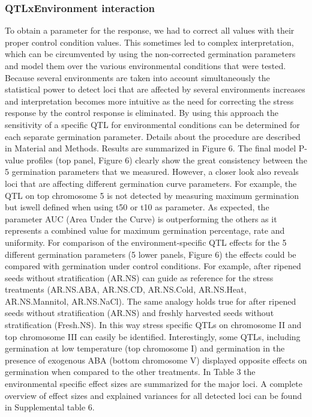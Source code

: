 \subsubsection{QTLxEnvironment interaction}
To obtain a parameter for the response, we had to correct all values with their proper control condition 
values. This sometimes led to complex interpretation, which can be circumvented by using the non-corrected 
germination parameters and model them over the various environmental conditions that were tested. Because 
several environments are taken into account simultaneously the statistical power to detect loci that are 
affected by several environments increases and interpretation becomes more intuitive as the need for 
correcting the stress response by the control response is eliminated. By using this approach the 
sensitivity of a specific QTL for environmental conditions can be determined for each separate germination 
parameter. Details about the procedure are described in Material and Methods. Results are summarized in 
Figure 6. The final model P-value profiles (top panel, Figure 6) clearly show the great consistency 
between the 5 germination parameters that we measured. However, a closer look also reveals loci that 
are affecting different germination curve parameters. For example, the QTL on top chromosome 5 is not 
detected by measuring maximum germination but iswell defined when using t50 or t10 as parameter. As 
expected, the parameter AUC (Area Under the Curve) is outperforming the others as it represents a 
combined value for maximum germination percentage, rate and uniformity. For comparison of the 
environment-specific QTL effects for the 5 different germination parameters (5 lower panels, Figure 6) 
the effects could be compared with germination under control conditions. For example, after ripened 
seeds without stratification (AR.NS) can guide as reference for the stress treatments (AR.NS.ABA, AR.NS.CD, 
AR.NS.Cold, AR.NS.Heat, AR.NS.Mannitol, AR.NS.NaCl). The same analogy holds true for after ripened seeds
without stratification (AR.NS) and freshly harvested seeds without stratification (Fresh.NS). In this way 
stress specific QTLs on chromosome II and top chromosome III can easily be identified. Interestingly, some 
QTLs, including germination at low temperature (top chromosome I) and germination in the presence of 
exogenous ABA (bottom chromosome V) displayed opposite effects on germination when compared to the 
other treatments. In Table 3 the environmental specific effect sizes are summarized for the major loci. 
A complete overview of effect sizes and explained variances for all detected loci can be found in 
Supplemental table 6. 

